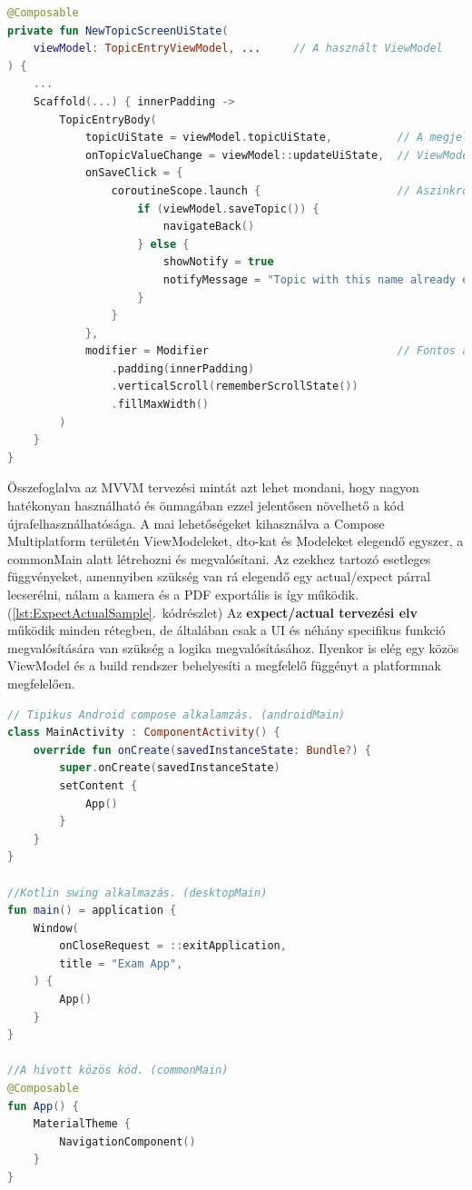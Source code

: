 \begin{lstlisting}[caption={Egy a View rétegbe tartozó felület leírásának részlete}, label={lst:ExampleUI}, language=Kotlin]
@Composable
private fun NewTopicScreenUiState(
    viewModel: TopicEntryViewModel, ...     // A használt ViewModel
) {
    ...
    Scaffold(...) { innerPadding ->
        TopicEntryBody(
            topicUiState = viewModel.topicUiState,          // A megjelenítendő UI adat
            onTopicValueChange = viewModel::updateUiState,  // ViewModelben definált függvény paraméterként való átadása
            onSaveClick = {
                coroutineScope.launch {                     // Aszinkron módon történő hívás, mentés funkció. Szintén a ViewModel függvényét hívja meg
                    if (viewModel.saveTopic()) {
                        navigateBack()
                    } else {
                        showNotify = true
                        notifyMessage = "Topic with this name already exists"
                    }
                }
            },
            modifier = Modifier                             // Fontos az igényes megjelenítés
                .padding(innerPadding)
                .verticalScroll(rememberScrollState())
                .fillMaxWidth()
        )
    }
}
\end{lstlisting}



Összefoglalva az MVVM tervezési mintát azt lehet mondani, hogy nagyon hatékonyan használható és önmagában ezzel jelentősen növelhető a kód újrafelhasználhatósága.
A mai lehetőségeket kihasználva a Compose Multiplatform területén ViewModeleket, dto-kat és Modeleket elegendő egyszer, a commonMain alatt létrehozni és megvalósítani.
Az ezekhez tartozó esetleges függvényeket, amennyiben szükség van rá elegendő egy actual/expect párral lecserélni, nálam a kamera és a PDF exportális is így működik. (\ref{lst:ExpectActualSample}.~kódrészlet) 
Az \textbf{expect/actual tervezési elv} működik minden rétegben, de általában csak a UI és néhány specifikus funkció megvalósítására van szükség a logika megvalósításához.
Ilyenkor is elég egy közös ViewModel és a build rendszer behelyesíti a megfelelő függényt a platformnak megfelelően.

\begin{lstlisting}[caption={Alkalamzás elindítása}, label={lst:Start}, language=Kotlin]
// Tipikus Android compose alkalamzás. (androidMain)
class MainActivity : ComponentActivity() {
    override fun onCreate(savedInstanceState: Bundle?) {
        super.onCreate(savedInstanceState)
        setContent {
            App()
        }
    }
}

//Kotlin swing alkalmazás. (desktopMain)
fun main() = application {
    Window(
        onCloseRequest = ::exitApplication,
        title = "Exam App",
    ) {
        App()
    }
}

//A hívott közös kód. (commonMain)
@Composable
fun App() {
    MaterialTheme {
        NavigationComponent()
    }
}
\end{lstlisting}

